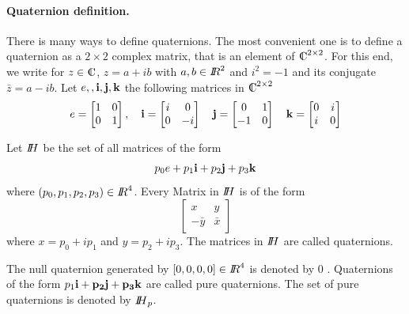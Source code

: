 \paragraph{Quaternion definition.} There is many ways to define quaternions. The most convenient one is to define a quaternion as
a $2\times 2$ complex matrix, that is an element of $\CC^{2\times 2}$. For this end, we write for $z \in \CC$, $z=a+ib$ with $a,b \in \mbox{\rm $I\!\!R$}^2$ and $i^2=-1$ and its conjugate $\bar z= a-ib$. Let ${e, \bf, i, j, k}$ the following matrices in $\CC^{2\times 2}$
\begin{equation}
  \label{eq:127}
  e =
  \begin{bmatrix}
    1 & 0 \\
    0 & 1  \\
  \end{bmatrix},
  \quad   \bf{i} =
  \begin{bmatrix}
    i & 0 \\
    0 & -i  \\
  \end{bmatrix}
  \quad   \bf{j} =
  \begin{bmatrix}
    0 & 1 \\
    -1 & 0  \\
  \end{bmatrix}
   \quad   \bf{k} =
  \begin{bmatrix}
    0 & i \\
    i & 0  \\
  \end{bmatrix}
\end{equation}

\begin{definition}
  Let $\mbox{\rm $I\!\!H$}$ be the set of all matrices of the form
  \begin{equation}
    \label{eq:128}
    p_0 e + p_1 {\bf i} + p_2 {\bf j} + p_3 {\bf k}
  \end{equation}
  where $(p_0,p_1,p_2,p_3) \in \mbox{\rm $I\!\!R$}^4$. Every Matrix in $\mbox{\rm $I\!\!H$}$ is of the form
  \begin{equation}
    \label{eq:129}
    \begin{bmatrix}
      x &y  \\
      - \bar y  & \bar x
    \end{bmatrix}
  \end{equation}
where $x = p_0 + i p_1$ and $y = p_2 + i p_3$. The matrices in $\mbox{\rm $I\!\!H$}$ are called quaternions.
\end{definition}


\begin{definition}
  The null quaternion generated by $[0,0,0,0] \in \mbox{\rm $I\!\!R$}^4$ is denoted by $0$ . Quaternions of the form $p_1 \bf {i} + p_2 \bf{j} + p_3 \bf{k}$ are called pure quaternions. The set of pure quaternions is denoted by $\mbox{\rm $I\!\!H$}_p$.
\end{definition}

